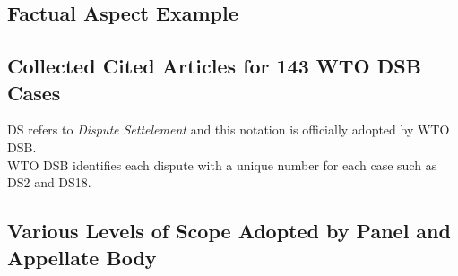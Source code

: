 \documentclass[12pt,letterpaper]{article}
\begin{document}
% 

% 




\begin{appendices}
  \section{}
  \label{sec:appendix}


  \subsection{Factual Aspect Example}
  \label{sub:factual-aspect-example}
  



  \subsection{Collected Cited Articles for 143 WTO DSB Cases}
  DS refers to \textit{Dispute Settelement} and this notation is officially adopted by WTO DSB.\\
  WTO DSB identifies each dispute with a unique number for each case such as DS2 and DS18.
  \label{xltabular:level-of-scopes}
  

  \subsection{Various Levels of Scope Adopted by Panel and Appellate Body}
  \label{sub:cited-articles-table}


\end{appendices}
\end{document}
